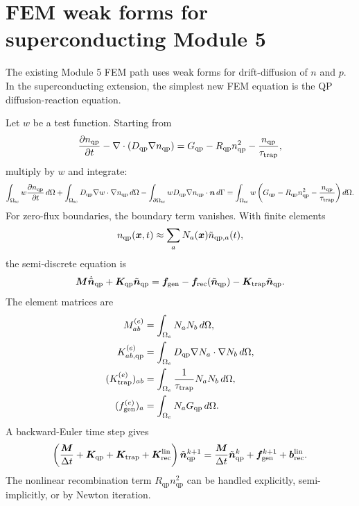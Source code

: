 \documentclass[11pt]{article}
\newcommand{\Om}{\Omega}
\newcommand{\Osc}{\Omega_{\mathrm{sc}}}
\newcommand{\x}{\bm{x}}
\newcommand{\nvecb}{\bm{n}}
\newcommand{\nqp}{n_{\mathrm{qp}}}
\newcommand{\Dqp}{D_{\mathrm{qp}}}
\newcommand{\Gqp}{G_{\mathrm{qp}}}
\newcommand{\Rqp}{R_{\mathrm{qp}}}
\newcommand{\tautrap}{\tau_{\mathrm{trap}}}
\begin{document}
\section{FEM weak forms for superconducting Module 5}

The existing Module 5 FEM path uses weak forms for drift-diffusion of \(n\) and \(p\). In the superconducting extension, the simplest new FEM equation is the QP diffusion-reaction equation.

Let \(w\) be a test function. Starting from
\begin{equation}
\pdv{\nqp}{t}-\nabla\cdot(\Dqp\nabla\nqp)=\Gqp-\Rqp\nqp^2-\frac{\nqp}{\tautrap},
\end{equation}
multiply by \(w\) and integrate:
\begin{equation}
\int_{\Osc} w\pdv{\nqp}{t}\,d\Om
+\int_{\Osc} \Dqp\nabla w\cdot\nabla\nqp\,d\Om
-\int_{\partial\Osc}w\Dqp\nabla\nqp\cdot\nvecb\,d\Gamma
=\int_{\Osc}w\left(\Gqp-\Rqp\nqp^2-\frac{\nqp}{\tautrap}\right)d\Om.
\end{equation}
For zero-flux boundaries, the boundary term vanishes. With finite elements
\begin{equation}
\nqp(\x,t)\approx \sum_a N_a(\x)\tilde n_{\qp,a}(t),
\end{equation}
the semi-discrete equation is
\begin{equation}
\bm{M}\dot{\tilde{\bm{n}}}_{\mathrm{qp}}+\bm{K}_{\mathrm{qp}}\tilde{\bm{n}}_{\mathrm{qp}}=\bm{f}_{\mathrm{gen}}-\bm{f}_{\mathrm{rec}}(\tilde{\bm{n}}_{\mathrm{qp}})-\bm{K}_{\mathrm{trap}}\tilde{\bm{n}}_{\mathrm{qp}}.
\end{equation}
The element matrices are
\begin{align}
M_{ab}^{(e)} &= \int_{\Omega_e} N_a N_b\,d\Om,\\
K_{ab,\qp}^{(e)} &= \int_{\Omega_e} \Dqp\nabla N_a\cdot\nabla N_b\,d\Om,\\
(K_{\mathrm{trap}}^{(e)})_{ab} &= \int_{\Omega_e}\frac{1}{\tautrap}N_aN_b\,d\Om,\\
(f_{\mathrm{gen}}^{(e)})_a &= \int_{\Omega_e}N_a\Gqp\,d\Om.
\end{align}
A backward-Euler time step gives
\begin{equation}
\left(\frac{\bm{M}}{\Delta t}+\bm{K}_{\mathrm{qp}}+\bm{K}_{\mathrm{trap}}+\bm{K}_{\mathrm{rec}}^{\mathrm{lin}}\right)\tilde{\bm{n}}_{\mathrm{qp}}^{k+1}
=\frac{\bm{M}}{\Delta t}\tilde{\bm{n}}_{\mathrm{qp}}^{k}+\bm{f}_{\mathrm{gen}}^{k+1}+\bm{b}_{\mathrm{rec}}^{\mathrm{lin}}.
\end{equation}
The nonlinear recombination term \(\Rqp\nqp^2\) can be handled explicitly, semi-implicitly, or by Newton iteration.
\end{document}
